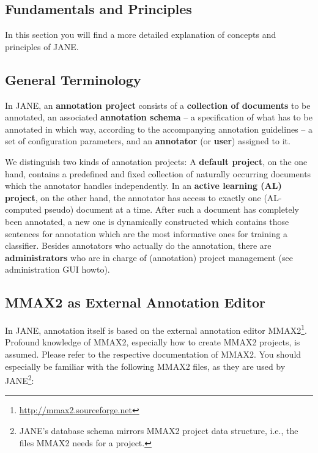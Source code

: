 \documentclass[DIV12,english,11pt,halfparskip]{scrartcl}
\begin{document}
 \newpage
\begin{appendix}
\appendix

\setcounter{figure}{0}
\section{Fundamentals and Principles}
\label{appendix:terminology}

In this section you will find a more detailed explanation of concepts
and principles of JANE.

\subsection{General Terminology}

In JANE, an \textbf{annotation project} consists of a
\textbf{collection of documents} to be annotated, an associated
\textbf{annotation schema} -- a specification of what has to be
annotated in which way, according to the accompanying annotation
guidelines -- a set of configuration parameters, and an
\textbf{annotator} (or \textbf{user}) assigned to it. 

We distinguish two kinds of annotation projects: A \textbf{default
  project}, on the one hand, contains a predefined and fixed
collection of naturally occurring documents which the annotator
handles independently. In an \textbf{active learning
  (AL) project}, on the other hand, the annotator has access to
exactly one (AL-computed pseudo) document at a time. After such a
document has completely been annotated, a new one is dynamically
constructed which contains those sentences for annotation which are
the most informative ones for training a classifier.  Besides
annotators who actually do the annotation, there are
\textbf{administrators} who are in charge of (annotation) project
management (see administration GUI howto).


\subsection{MMAX2 as External Annotation Editor}
In JANE, annotation itself is based on the external annotation editor
MMAX2\footnote{\url{http://mmax2.sourceforge.net}}. Profound knowledge
of MMAX2, especially how to create MMAX2 projects,\index{} is assumed.
Please refer to the respective documentation of MMAX2.  You should
especially be familiar with the following MMAX2 files, as they are
used by JANE\footnote{JANE's database schema mirrors MMAX2 project
  data structure, i.e., the files MMAX2 needs for a project.}:


\end{appendix}
\end{document}
